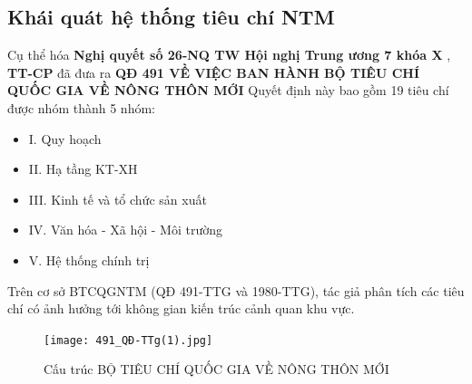 \documentclass[../thesis.tex]{subfiles}
\begin{document}
\subsection {Khái quát hệ thống tiêu chí NTM}

Cụ thể hóa \textbf{Nghị quyết số 26-NQ TW Hội nghị Trung ương 7 khóa X} ,\textbf{ TT-CP} đã đưa ra\textbf{ QĐ 491 VỀ VIỆC BAN HÀNH BỘ TIÊU CHÍ QUỐC GIA VỀ NÔNG THÔN MỚI}
Quyết định này bao gồm 19 tiêu chí được nhóm thành 5 nhóm:
\begin{itemize}
\item I. Quy hoạch
\item II. Hạ tầng KT-XH
\item III. Kinh tế và tổ chức sản xuất
\item IV. Văn hóa - Xã hội - Môi trường
\item V. Hệ thống chính trị
\end{itemize}
Trên cơ sở BTCQGNTM (QĐ 491-TTG và 1980-TTG), tác giả phân tích các tiêu chí có ảnh hưởng tới không gian kiến trúc cảnh quan khu vực.
\begin{figure}[ht!]
\texttt{[image: 491\_QĐ-TTg(1).jpg]}
\caption{Cấu trúc BỘ TIÊU CHÍ QUỐC GIA VỀ NÔNG THÔN MỚI}
\end{figure}
\end{document}
